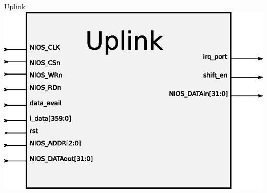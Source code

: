 \documentclass[xcolor=dvipsnames]{beamer}
\begin{document}
\begin{frame}{Uplink}
\center 
\includegraphics[scale=0.60]{figures/bloquplink.eps}
\end{frame}
\end{document}
